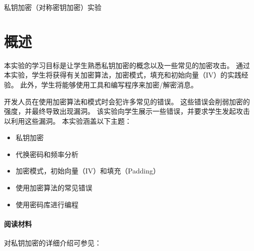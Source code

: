 
\newcommand{\commonfolder}{../../common-files}









\begin{center}
{\LARGE 私钥加密（对称密钥加密）实验}
\end{center}


\setcounter{task}{1}
\newcommand{\tasks} {\bf {\noindent (\arabic{task})} \addtocounter{task}{1} \,}



\section{概述}

本实验的学习目标是让学生熟悉私钥加密的概念以及一些常见的加密攻击。
通过本实验，学生将获得有关加密算法，加密模式，填充和初始向量（IV）的实践经验。
此外，学生将能够使用工具和编写程序来加密/解密消息。

开发人员在使用加密算法和模式时会犯许多常见的错误。
这些错误会削弱加密的强度，并最终导致出现漏洞。
该实验向学生展示一些错误，并要求学生发起攻击以利用这些漏洞。
本实验涵盖以下主题：

\begin{itemize}[noitemsep]
\item 私钥加密
\item 代换密码和频率分析
\item 加密模式，初始向量（IV）和填充（Padding）
\item 使用加密算法的常见错误
\item 使用密码库进行编程
\end{itemize}


\paragraph{阅读材料}
对私钥加密的详细介绍可参见：

